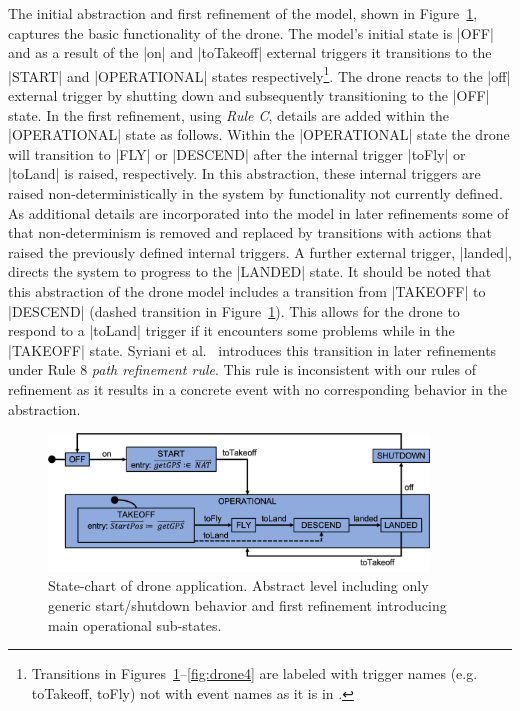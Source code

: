 The initial abstraction and first refinement of the model, shown in Figure~\ref{fig:drone1}, captures the basic functionality of the drone. 
The model's initial state is |OFF| and as a result of the |on| and  |toTakeoff| external triggers it transitions to the |START| and |OPERATIONAL| states respectively\footnote{Transitions in Figures~\ref{fig:drone1}--\ref{fig:drone4} are labeled with trigger names
(e.g. toTakeoff, toFly) not with event names as it is in \UMLB.}. 
The drone reacts to the |off| external trigger by shutting down and subsequently transitioning to the |OFF| state.
In the first refinement, using \emph{Rule C}, details are added within the |OPERATIONAL| state as follows.
Within the |OPERATIONAL| state the drone will transition to |FLY| or |DESCEND| after the internal trigger |toFly| or |toLand| is raised, respectively. 
In this abstraction, these internal triggers are raised non-deterministically in the system by functionality not currently defined.
As additional details are incorporated into the model in later refinements some of that non-determinism is 
removed and replaced by transitions with actions that raised the previously defined internal triggers.
A further external trigger, |landed|, directs the system to progress to the |LANDED| state.
It should be noted that this abstraction of the drone model includes a transition from |TAKEOFF| to |DESCEND| (dashed transition in Figure~\ref{fig:drone1}). 
This allows for the drone to respond to a |toLand| trigger if it encounters some problems while in the |TAKEOFF| state.
Syriani et al.~\cite{Syriani_2019} introduces this transition in later refinements under Rule 8 \emph{path refinement rule}. 
This rule is inconsistent with our rules of refinement as it results in a concrete event with no corresponding behavior in the abstraction.
\begin{figure}[]
	\vspace{-.4cm}
	\centering
	\includegraphics[width=0.90\textwidth, trim=0 40 0 0]{figures/Picture1.png}
	\caption{State-chart of drone application. Abstract level including only generic start/shutdown behavior and first refinement introducing main operational sub-states. }
	\label{fig:drone1}
	\vspace{-.4cm}
\end{figure} 


